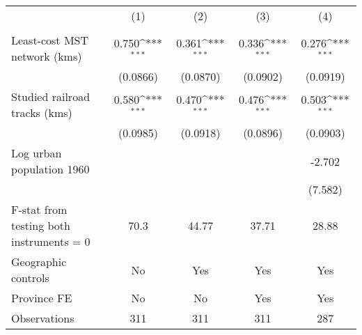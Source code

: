{
\def\sym#1{\ifmmode^{#1}\else\(^{#1}\)\fi}
\begin{tabular}{l*{4}{c}}
\hline\hline
                &\multicolumn{1}{c}{(1)}&\multicolumn{1}{c}{(2)}&\multicolumn{1}{c}{(3)}&\multicolumn{1}{c}{(4)}\\
                &\multicolumn{1}{c}{}&\multicolumn{1}{c}{}&\multicolumn{1}{c}{}&\multicolumn{1}{c}{}\\
\hline
Least-cost MST network (kms)&    0.750\sym{***}&    0.361\sym{***}&    0.336\sym{***}&    0.276\sym{***}\\
                & (0.0866)         & (0.0870)         & (0.0902)         & (0.0919)         \\
[1em]
Studied railroad tracks (kms)&    0.580\sym{***}&    0.470\sym{***}&    0.476\sym{***}&    0.503\sym{***}\\
                & (0.0985)         & (0.0918)         & (0.0896)         & (0.0903)         \\
[1em]
Log urban population 1960&                  &                  &                  &   -2.702         \\
                &                  &                  &                  &  (7.582)         \\
\hline
F-stat from testing both instruments = 0&     70.3         &    44.77         &    37.71         &    28.88         \\
Geographic controls&       No         &      Yes         &      Yes         &      Yes         \\
Province FE     &       No         &       No         &      Yes         &      Yes         \\
Observations    &      311         &      311         &      311         &      287         \\
\hline\hline
\end{tabular}
}
